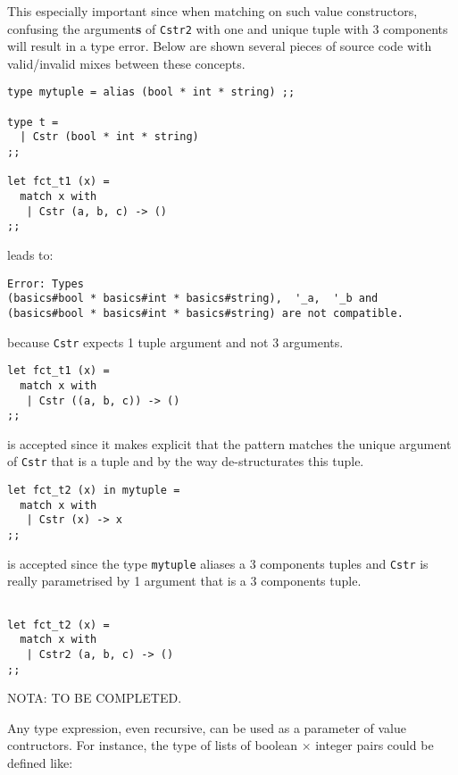 \medskip
This especially important since when matching on such value
constructors, confusing the argument{\bf s} of {\tt Cstr2} with
one and unique tuple with 3 components will result in a type error.
Below are shown several pieces of source code with valid/invalid mixes
between these concepts.

{\scriptsize
\begin{lstlisting}
type mytuple = alias (bool * int * string) ;;

type t =
  | Cstr (bool * int * string)
;;

let fct_t1 (x) =
  match x with
   | Cstr (a, b, c) -> ()
;;
\end{lstlisting}}

\noindent leads to:

\begin{verbatim}
Error: Types
(basics#bool * basics#int * basics#string),  '_a,  '_b and
(basics#bool * basics#int * basics#string) are not compatible.
\end{verbatim}
\noindent because {\tt Cstr} expects 1 tuple argument and not 3
arguments.

\medskip
{\scriptsize
\begin{lstlisting}
let fct_t1 (x) =
  match x with
   | Cstr ((a, b, c)) -> ()
;;
\end{lstlisting}}

\noindent is accepted since it makes explicit that the pattern matches
the unique argument of {\tt Cstr} that is a tuple and by the way
de-structurates this tuple.

\medskip
{\scriptsize
\begin{lstlisting}
let fct_t2 (x) in mytuple =
  match x with
   | Cstr (x) -> x
;;
\end{lstlisting}}

\noindent is accepted since the type {\tt mytuple} aliases a 3
components tuples and {\tt Cstr} is really parametrised by 1 argument
that is a 3 components tuple.

{\scriptsize
\begin{lstlisting}

let fct_t2 (x) =
  match x with
   | Cstr2 (a, b, c) -> ()
;;
\end{lstlisting}}

NOTA: TO BE COMPLETED.

Any type expression, even recursive, can be used as a  parameter of
value contructors.
For instance, the type of lists of boolean $\times$ integer pairs
could be defined like:

